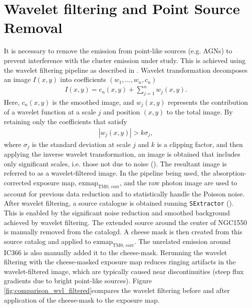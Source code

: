 \section{Wavelet filtering and Point Source Removal}
It is necessary to remove the emission from point-like sources (e.g. AGNs) to prevent interference with the cluster emission under study. This is achieved using the wavelet filtering pipeline as described in \cite{Pacaud2006}. Wavelet transformation decomposes an image \(I(x, y)\) into coefficients \((w_1, \ldots, w_n, c_n)\)
\begin{align*}
I(x, y) = c_n(x, y) + \sum_{j=1}^{n}w_j(x, y).    
\end{align*}
Here, \(c_n(x, y)\) is the smoothed image, and \(w_j(x, y)\) represents the contribution of a wavelet function at a scale \(j\) and position \((x, y)\) to the total image. By retaining only the coefficients that satisfy
\begin{align*}
|w_j(x, y)| > k\sigma_j,
\end{align*}
where \(\sigma_j\) is the standard deviation at scale \(j\) and \(k\) is a clipping factor, and then applying the inverse wavelet transformation, an image is obtained that includes only significant scales, i.e. those not due to noise (\cite{Stark1998}). The resultant image is referred to as a wavelet-filtered image. In the pipeline being used, the absorption-corrected exposure map, \(\text{exmap}_\text{TM0, corr}\), and the raw photon image are used to account for previous data reduction and to statistically handle the Poisson noise. After wavelet filtering, a source catalogue is obtained running \texttt{SExtractor} (\cite{Bertin1996}). This is enabled by the significant noise reduction and smoothed background achieved by wavelet filtering. The extended source around the center of NGC1550 is manually removed from the catalogd. A cheese mask is then created from this source catalog and applied to \(\text{exmap}_\text{TM0, corr}\). The unrelated emission around IC366 is also manually added it to the cheese-mask. Rerunning the wavelet filtering with the cheese-masked exposure map reduces ringing artifacts in the wavelet-filtered image, which are typically caused near discontinuities (steep flux gradients due to bright point-like sources). Figure \ref{fig:comparison_wvl_filtered}compares the wavelet filtering before and after application of the cheese-mask to the exposure map.
%
